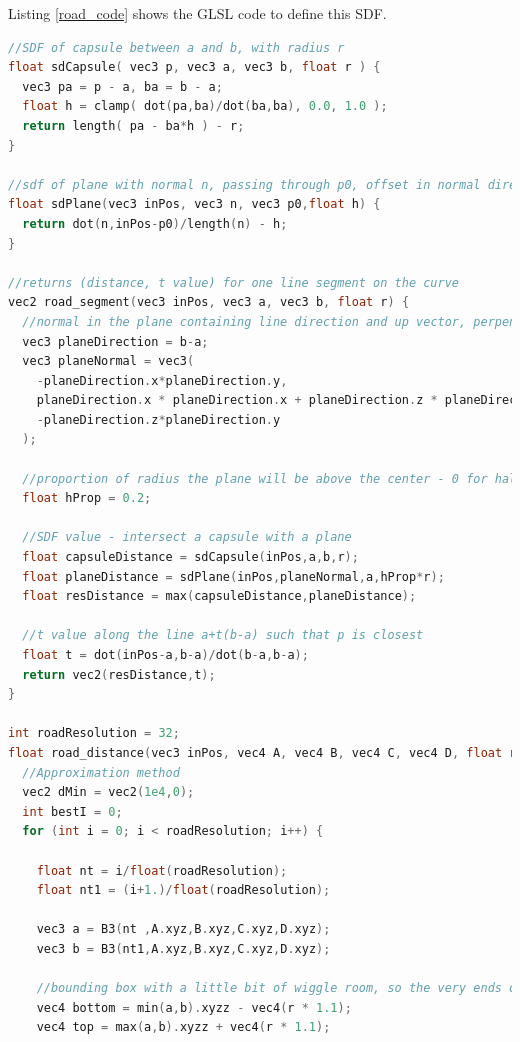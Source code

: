 \documentclass{article}
\begin{document}
Listing \ref{road_code} shows the GLSL code to define this SDF.

\begin{lstlisting}[language=C++,label={road_code},caption={The full SDF code for the shape discussed above. \texttt{road\_distance} is the SDF for part of the shape defined by a single cubic Bezier curve. When an interpolation spline consisting of multiple curves is required, a \texttt{Brush} object is created for each.}]
//SDF of capsule between a and b, with radius r
float sdCapsule( vec3 p, vec3 a, vec3 b, float r ) {
  vec3 pa = p - a, ba = b - a;
  float h = clamp( dot(pa,ba)/dot(ba,ba), 0.0, 1.0 );
  return length( pa - ba*h ) - r;
}

//sdf of plane with normal n, passing through p0, offset in normal direction by h
float sdPlane(vec3 inPos, vec3 n, vec3 p0,float h) {
  return dot(n,inPos-p0)/length(n) - h;
}

//returns (distance, t value) for one line segment on the curve
vec2 road_segment(vec3 inPos, vec3 a, vec3 b, float r) {
  //normal in the plane containing line direction and up vector, perpendicular to direction
  vec3 planeDirection = b-a;
  vec3 planeNormal = vec3(
    -planeDirection.x*planeDirection.y,
    planeDirection.x * planeDirection.x + planeDirection.z * planeDirection.z, 
    -planeDirection.z*planeDirection.y
  );

  //proportion of radius the plane will be above the center - 0 for half-circle cross-section, 1 for circle cross-section
  float hProp = 0.2;

  //SDF value - intersect a capsule with a plane
  float capsuleDistance = sdCapsule(inPos,a,b,r);
  float planeDistance = sdPlane(inPos,planeNormal,a,hProp*r);
  float resDistance = max(capsuleDistance,planeDistance);

  //t value along the line a+t(b-a) such that p is closest
  float t = dot(inPos-a,b-a)/dot(b-a,b-a);
  return vec2(resDistance,t);
}

int roadResolution = 32;
float road_distance(vec3 inPos, vec4 A, vec4 B, vec4 C, vec4 D, float r) {
  //Approximation method
  vec2 dMin = vec2(1e4,0);
  int bestI = 0;
  for (int i = 0; i < roadResolution; i++) {

    float nt = i/float(roadResolution);
    float nt1 = (i+1.)/float(roadResolution);

    vec3 a = B3(nt ,A.xyz,B.xyz,C.xyz,D.xyz);
    vec3 b = B3(nt1,A.xyz,B.xyz,C.xyz,D.xyz);

    //bounding box with a little bit of wiggle room, so the very ends of the line are always generated properly
    vec4 bottom = min(a,b).xyzz - vec4(r * 1.1);
    vec4 top = max(a,b).xyzz + vec4(r * 1.1);


\end{lstlisting}
\end{document}
